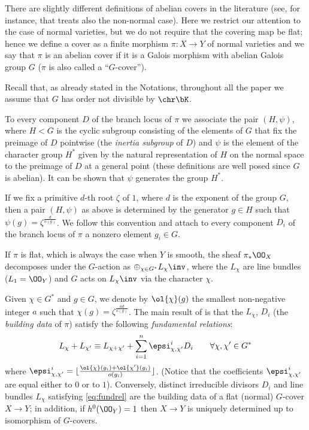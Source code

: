 \documentclass[10pt]{amsart}
\numberwithin{equation}{section}
\begin{document}
There are slightly different definitions of abelian covers in the literature (see, for instance,  \cite{AlexeevPardini_Covers} that treats also the non-normal case). Here we restrict our attention to the case of normal varieties, but we do not require that the covering map be flat; hence we  define a cover as a finite  morphism $\pi\colon X\to Y$ of normal  
varieties and we say that  $\pi$  is an abelian cover  if it is a Galois morphism  with abelian  Galois group $G$ ($\pi$ is also called a ``$G$-cover'').

Recall that, as already stated in the Notations,   throughout all the paper we assume that $G$ has  order not divisible by $\chr \bK$. 


To every component $D$ of the branch locus of $\pi$ we associate the pair $(H,\psi)$, where $H<G$ is the cyclic subgroup consisting of the elements of $G$ that fix the preimage of $D$ pointwise (the {\em inertia subgroup} of  $D$) and $\psi$ is the element  of the character group $H^*$ given by the    natural   representation of $H$ on the normal space to the preimage of $D$ at a general point (these definitions are well posed since $G$ is abelian).
It can be shown  that $\psi$ generates the group $H^*$.

If we fix a primitive  $d$-th root $\zeta$ of $1$, where $d$ is the exponent of the group $G$, then a pair $(H,\psi)$ as above is determined by  the generator    $g\in H$ such that $\psi(g)=\zeta^{\frac {d} {o(g)}}$. We follow  this convention and attach to  every component $D_i$ of the branch locus of $\pi$ a nonzero element $g_i\in G$.


If $\pi$ is flat, which is always the case when $Y$ is smooth, the sheaf $\pi_*\OO_X$ decomposes under the $G$-action as $\oplus_{\chi\in G^*}L_{\chi}\inv$, where the $L_{\chi}$ are line bundles ($L_1=\OO_Y$) and $G$ acts on $L_{\chi}\inv$  via the character $\chi$. 

Given $\chi\in G^*$ and $g\in G$, we denote by $\ol{\chi}(g)$ the smallest non-negative integer $a$ such that $\chi(g)=\zeta^{\frac {ad}{o(g)}}$.  The main result of \cite{Pardini_AbelianCovers} is that the $L_{\chi}$, $D_i$ (the {\em building data} of $\pi$) satisfy the following {\em fundamental relations}:
\begin{equation} \label{eq:fundrel}
L_{\chi}+L_{\chi'}\equiv L_{\chi+\chi'}+\sum_{i=1}^n \epsi^i_{\chi,\chi'} D_i\qquad \forall \chi,\chi' \in G^*
\end{equation}
where $\epsi^i_{\chi,\chi'}=\lfloor \frac{\ol{\chi}(g_i)+\ol{\chi'}(g_i)}{o(g_i)}\rfloor$. (Notice that the coefficients $\epsi^i_{\chi,\chi'}$ are equal either to $0$ or to $1$). Conversely, distinct irreducible divisors $D_i$ and line bundles $L_{\chi}$ satisfying \eqref{eq:fundrel}  are the building data of a flat (normal) $G$-cover  $X\to Y$; in addition, if  $h^0(\OO_Y)=1$ then $X\to Y$ is uniquely determined up to isomorphism of $G$-covers.\\
\end{document}
